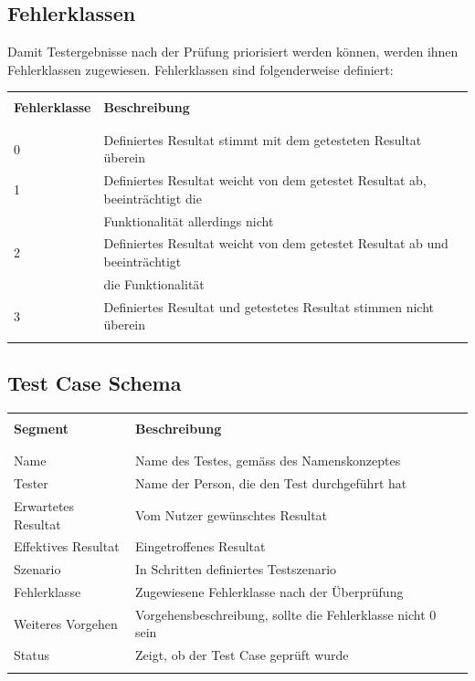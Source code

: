 \subsection{Fehlerklassen}
Damit Testergebnisse nach der Prüfung priorisiert werden können, werden ihnen Fehlerklassen zugewiesen.
Fehlerklassen sind folgenderweise definiert:
\begin{table}[H]
  \begin{tabularx}{\textwidth}{l l X}\hline \\
  \textbf{Fehlerklasse} & \textbf{Beschreibung} \\ \\\hline \\
  0 & Definiertes Resultat stimmt mit dem getesteten Resultat überein \\
  1 & Definiertes Resultat weicht von dem getestet Resultat ab, beeinträchtigt die \\
    & Funktionalität allerdings nicht \\
  2 & Definiertes Resultat weicht von dem getestet Resultat ab und beeinträchtigt \\
    & die Funktionalität \\
  3 & Definiertes Resultat und getestetes Resultat stimmen nicht überein \\
  \\\hline
  \end{tabularx}
\end{table}
\subsection{Test Case Schema}
\begin{table}[H]
  \begin{tabularx}{\textwidth}{l l X}\hline \\
  \textbf{Segment} & \textbf{Beschreibung} \\ \\\hline \\
  Name & Name des Testes, gemäss des Namenskonzeptes \\
  Tester & Name der Person, die den Test durchgeführt hat \\
  Erwartetes Resultat & Vom Nutzer gewünschtes Resultat \\
  Effektives Resultat & Eingetroffenes Resultat \\
  Szenario & In Schritten definiertes Testszenario \\
  Fehlerklasse & Zugewiesene Fehlerklasse nach der Überprüfung \\
  Weiteres Vorgehen & Vorgehensbeschreibung, sollte die Fehlerklasse nicht 0 sein \\
  Status & Zeigt, ob der Test Case geprüft wurde \\
  \\\hline
  \end{tabularx}
\end{table}
